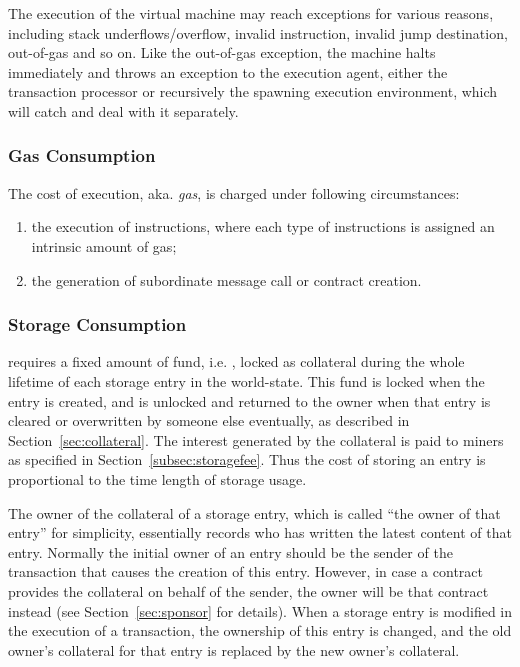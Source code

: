 The execution of the virtual machine may reach exceptions for various reasons, including stack underflows/overflow, invalid instruction, invalid jump destination, out-of-gas and so on.
Like the out-of-gas exception, the machine halts immediately and throws an exception to the execution agent, either the transaction processor or recursively the spawning execution environment, which will catch and deal with it separately. 



\subsubsection{Gas Consumption}

The cost of execution, aka. \emph{gas}, is charged under following circumstances:
\begin{enumerate}[nosep]
	\item the execution of instructions, where each type of instructions is assigned an intrinsic amount of gas;

	\item the generation of subordinate message call or contract creation.

\end{enumerate}


\subsubsection{Storage Consumption}
	\label{subsec:storage consumption}

	\name requires a fixed amount of fund, i.e. \sunitprice, locked as collateral during the whole lifetime of each \sunitsize storage entry in the world-state.
	This fund is locked when the entry is created, and is unlocked and returned to the owner when that entry is cleared or overwritten by someone else eventually, as described in Section~\ref{sec:collateral}.
	The interest generated by the collateral is paid to miners as specified in Section~\ref{subsec:storagefee}. 
	Thus the cost of storing an entry  
	is proportional to the time length of storage usage.

	
	The owner of the collateral of a storage entry, 
	which is called ``the owner of that entry'' for simplicity, 
	essentially records who has written the latest content of that entry.
	Normally the initial owner of an entry should be the sender of the transaction that causes the creation of this entry. 
	However, in case a contract provides the collateral on behalf of the sender, the owner will be that contract instead (see Section~\ref{sec:sponsor} for details).
	When a storage entry is modified in the execution of a transaction,
	the ownership of this entry is changed,
	and the old owner's collateral for that entry is replaced by the new owner's collateral.


